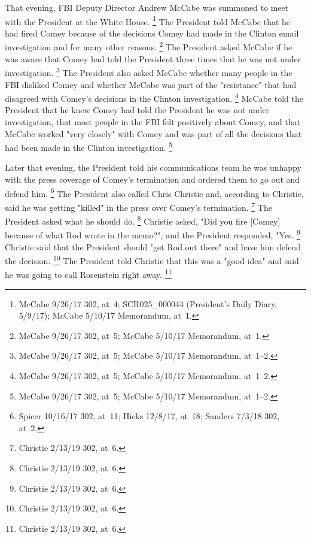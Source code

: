 {That evening, FBI Deputy Director Andrew McCabe was summoned to meet with the President at the White House.%
\footnote{McCabe 9/26/17 302, at~4;
SCR025\_000044 (President's Daily Diary, 5/9/17);
McCabe 5/10/17 Memorandum, at~1.}
The President told McCabe that he had fired Comey because of the decisions Comey had made in the Clinton email investigation and for many other reasons.%
\footnote{McCabe 9/26/17 302, at~5;
McCabe 5/10/17 Memorandum, at~1.}
The President asked McCabe if he was aware that Comey had told the President three times that he was not under investigation.%
\footnote{McCabe 9/26/17 302, at~5;
McCabe 5/10/17 Memorandum, at~1--2.}
The President also asked McCabe whether many people in the FBI disliked Comey and whether McCabe was part of the "resistance" that had disagreed with Comey's decisions in the Clinton investigation.%
\footnote{McCabe 9/26/17 302, at~5;
McCabe 5/10/17 Memorandum, at~1--2.}
McCabe told the President that he knew Comey had told the President he was not under investigation, that most people in the FBI felt positively about Comey, and that McCabe worked "very closely" with Comey and was part of all the decisions that had been made in the Clinton investigation.%
\footnote{McCabe 9/26/17 302, at~5;
McCabe 5/10/17 Memorandum, at~1--2.}

Later that evening, the President told his communications team he was unhappy with the press coverage of Comey's termination and ordered them to go out and defend him.%
\footnote{Spicer 10/16/17 302, at~11;
Hicks 12/8/17, at~18;
Sanders 7/3/18 302, at~2.}
The President also called Chris Christie and, according to Christie, said he was getting "killed" in the press over Comey's termination.%
\footnote{Christie 2/13/19 302, at~6.}
The President asked what he should do.%
\footnote{Christie 2/13/19 302, at~6.}
Christie asked, "Did you fire [Comey] because of what Rod wrote in the memo?", and the President responded, "Yes.%
\footnote{Christie 2/13/19 302, at~6.}
Christie said that the President should "get Rod out there" and have him defend the decision.%
\footnote{Christie 2/13/19 302, at~6.}
The President told Christie that this was a "good idea" and said he was going to call Rosenstein right away.%
\footnote{Christie 2/13/19 302, at~6.}

}

